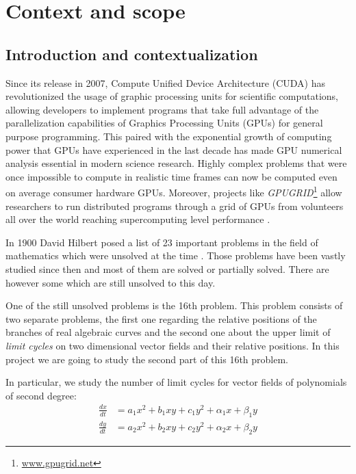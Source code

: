 
\section{Context and scope}%
\label{sec:context}

\subsection{Introduction and contextualization}%
\label{sub:intro}

Since its release in 2007, Compute Unified Device Architecture (CUDA) has
revolutionized the usage of graphic processing units for scientific
computations, allowing developers to implement programs that take full advantage
of the parallelization capabilities of Graphics Processing Units (GPUs) for
general purpose programming. This paired with the exponential growth of
computing power that GPUs have experienced in the last decade has made GPU
numerical analysis essential in modern science research. Highly complex problems
that were once impossible to compute in realistic time frames can now be
computed even on average consumer hardware GPUs. Moreover, projects like
\emph{GPUGRID}\footnote{\url{www.gpugrid.net}} allow researchers to run
distributed programs through a grid of GPUs from volunteers all over the world
reaching supercomputing level performance \cite{antaviana_nvidia_2008}.

In 1900 David Hilbert posed a list of 23 important problems in the field of mathematics
which were unsolved at the time
\cite{hilbert_mathematische_1900,hilbert_mathematical_1902}. Those
problems have been vastly studied since then and most of them are solved or
partially solved. There are however some which are still unsolved to this day.

One of the still unsolved problems is the 16th problem. This problem consists of
two separate problems, the first one regarding the relative positions of the
branches of real algebraic curves and the second one about the upper limit of
{\em limit cycles} on two dimensional vector fields and their relative positions. In
this project we are going to study the second part of this 16th problem.

In particular, we study the number of limit cycles for vector fields of
polynomials of second degree:
\begin{align}\label{eq:system}
    \frac{dx}{dt} &= a_1x^2 + b_1xy + c_1y^2 + \alpha_1x + \beta_1y \nonumber \\
    \frac{dy}{dt} &= a_2x^2 + b_2xy + c_2y^2 + \alpha_2x + \beta_2y
\end{align}

